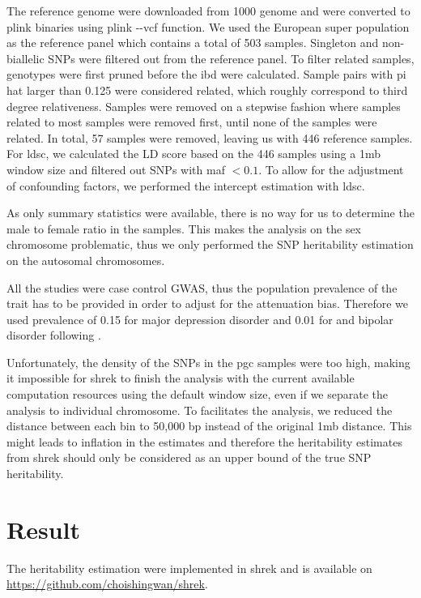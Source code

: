\documentclass[12pt]{scrbook}
\newcommand*{\glng}{\glsentrylong}
\begin{document}
The reference genome were downloaded from 1000 genome \citep{Project2012} and were converted to plink binaries using plink -{}-vcf function. 
We used the European super population as the reference panel which contains a total of 503 samples.
Singleton and non-biallelic \glspl{SNP} were filtered out from the reference panel.
To filter related samples, genotypes were first pruned before the \gls{ibd} were calculated.
Sample pairs with pi hat larger than 0.125 were considered related, which roughly correspond to third degree relativeness. 
Samples were removed on a stepwise fashion where samples related to most samples were removed first, until none of the samples were related. 
In total, 57 samples were removed, leaving us with 446 reference samples. 
For \gls{ldsc}, we calculated the \gls{LD} score based on the 446 samples using a 1\gls{mb} window size and filtered out \glspl{SNP} with \gls{maf} $<0.1$.
To allow for the adjustment of confounding factors, we performed the intercept estimation with \gls{ldsc}.

As only summary statistics were available, there is no way for us to determine the male to female ratio in the samples. 
This makes the analysis on the sex chromosome problematic, thus we only performed the \gls{SNP} heritability estimation on the autosomal chromosomes.

All the studies were case control \gls{GWAS}, thus the population prevalence of the trait has to be provided in order to adjust for the attenuation bias. 
Therefore we used prevalence of 0.15 for major depression disorder and 0.01 for \glng{scz} and bipolar disorder following \citet{Bulik-Sullivan2015}.

Unfortunately, the density of the \glspl{SNP} in the \gls{pgc} \glng{scz} samples were too high, making it impossible for \gls{shrek} to finish the analysis with the current available computation resources using the default window size, even if we separate the analysis to individual chromosome.
To facilitates the analysis, we reduced the distance between each bin to 50,000 bp instead of the original 1\gls{mb} distance. 
This might leads to inflation in the estimates and therefore the heritability estimates from \gls{shrek} should only be considered as an upper bound of the true \gls{SNP} heritability.


\section{Result}
The heritability estimation were implemented in \gls{shrek} and is available on \url{https://github.com/choishingwan/shrek}.  
\end{document}
